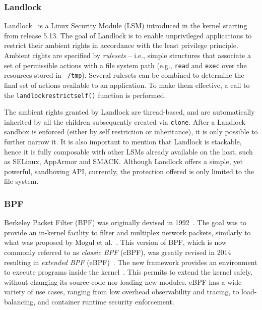 \subsubsection*{Landlock}

Landlock~\cite{landlock} is a Linux Security Module (LSM) introduced
in the kernel starting from release 5.13. The goal of Landlock is to
enable unprivileged applications to restrict their ambient rights in
accordance with the least privilege principle. Ambient rights are
specified by {\em rulesets} -- i.e., simple structures that
associate a set of permissible actions with a file system path (e.g.,
{\tt read} and {\tt exec} over the resources stored in {\tt
  /tmp}). Several rulesets can be combined to determine the final set
of actions available to an application. To make them effective, a call
to the {\tt landlock\textunderscore restrict\textunderscore self()}
function is performed.

The ambient rights granted by Landlock are thread-based, and are
automatically inherited by all the children subsequently created via
{\tt clone}. After a Landlock sandbox is enforced (either by self
restriction or inheritance), it is only possible to further narrow it.
It is also important to mention that Landlock is stackable, hence it
is fully composable with other LSMs already available on the host, such
as SELinux, AppArmor and SMACK.
%
Although Landlock offers a simple, yet powerful, sandboxing API,
currently, the protection offered is only limited to the file system.


\subsubsection*{BPF}

Berkeley Packet Filter (BPF) was originally devised in
1992~\cite{bpf-usenix93}. The goal was to provide an in-kernel
facility to filter and multiplex network packets, similarly to what
was proposed by Mogul et al.~\cite{mogul1987packer}. This version of
BPF, which is now commonly referred to as {\em classic BPF} (cBPF),
was greatly revised in 2014 resulting in {\em extended BPF}
(eBPF)~\cite{corbet2014eBPF}. The new framework provides an
environment to execute programs inside the kernel~\cite{greggebpf,
  kehoe2022ebpf}. This permits to extend the kernel safely, without
changing its source code nor loading new modules.  eBPF has a wide
variety of use cases, ranging from low overhead observability and
tracing, to load-balancing, and container runtime security
enforcement.

